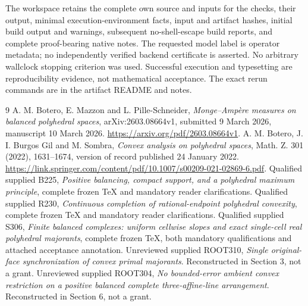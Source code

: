 \documentclass[11pt]{article}
\begin{document}
The workspace retains the complete own source and inputs for the checks, their output, minimal execution-environment facts, input and artifact hashes, initial build output and warnings, subsequent no-shell-escape build reports, and complete proof-bearing native notes. The requested model label is operator metadata; no independently verified backend certificate is asserted. No arbitrary wallclock stopping criterion was used. Successful execution and typesetting are reproducibility evidence, not mathematical acceptance. The exact rerun commands are in the artifact README and notes.

\begin{thebibliography}{9}
 A. M. Botero, E. Mazzon and L. Pille-Schneider, \emph{Monge--Amp\`ere measures on balanced polyhedral spaces}, arXiv:2603.08664v1, submitted 9 March 2026, manuscript 10 March 2026. \url{https://arxiv.org/pdf/2603.08664v1}.
 A. M. Botero, J. I. Burgos Gil and M. Sombra, \emph{Convex analysis on polyhedral spaces}, Math. Z. 301 (2022), 1631--1674, version of record published 24 January 2022. \url{https://link.springer.com/content/pdf/10.1007/s00209-021-02869-6.pdf}.
 Qualified supplied B225, \emph{Positive balancing, compact support, and a polyhedral maximum principle}, complete frozen TeX and mandatory reader clarifications.
 Qualified supplied R230, \emph{Continuous completion of rational-endpoint polyhedral convexity}, complete frozen TeX and mandatory reader clarifications.
 Qualified supplied S306, \emph{Finite balanced complexes: uniform cellwise slopes and exact single-cell real polyhedral majorants}, complete frozen TeX, both mandatory qualifications and attached acceptance annotation.
 Unreviewed supplied ROOT310, \emph{Single original-face synchronization of convex primal majorants}. Reconstructed in Section 3, not a grant.
 Unreviewed supplied ROOT304, \emph{No bounded-error ambient convex restriction on a positive balanced complete three-affine-line arrangement}. Reconstructed in Section 6, not a grant.
\end{thebibliography}
\end{document}
